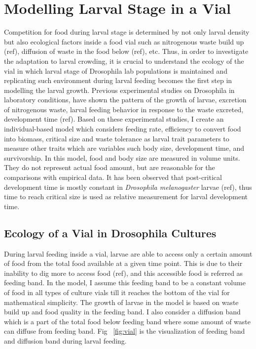 \chapter{Modelling Larval Stage in a Vial}
 Competition for food during larval stage is determined by not only larval density but also ecological factors inside a food vial such as nitrogenous waste build up (ref), diffusion of waste in the food below (ref), etc. Thus, in order to investigate the adaptation to larval crowding, it is crucial to understand the ecology of the vial in which larval stage of Drosophila lab populations is maintained and replicating such environment during larval feeding becomes the first step in modelling the larval growth. Previous experimental studies on Drosophila in laboratory conditions, have shown the pattern of the growth of larvae, excretion of nitrogenous waste, larval feeding behavior in response to the waste excreted, development time (ref). Based on these experimental studies, I create an individual-based model which considers feeding rate, efficiency to convert food into biomass, critical size and waste tolerance as larval trait parameters to measure other traits which are variables such body size, development time, and survivorship. In this model, food and body size are measured in volume units. They do not represent actual food amount, but are reasonable for the comparisons with empirical data. It has been observed that post-critical development time is mostly constant in \textit{Drosophila melanogaster} larvae (ref), thus time to reach critical size is used as relative measurement for larval development time.
\section{Ecology of a Vial in Drosophila Cultures}
During larval feeding inside a vial, larvae are able to access only a certain amount of food from the total food available at a given time point. This is due to their inability to dig more to access food (ref), and this accessible food is referred as feeding band. In the model, I assume this feeding band to be a constant volume of food in all types of culture vials till it reaches the bottom of the vial for mathematical simplicity. The growth of larvae in the model is based on waste build up and food quality in the feeding band. I also consider a diffusion band which is a part of the total food below feeding band where some amount of waste can diffuse from feeding band. Fig ~\ref{fig:vial} is the visualization of feeding band and diffusion band during larval feeding.


